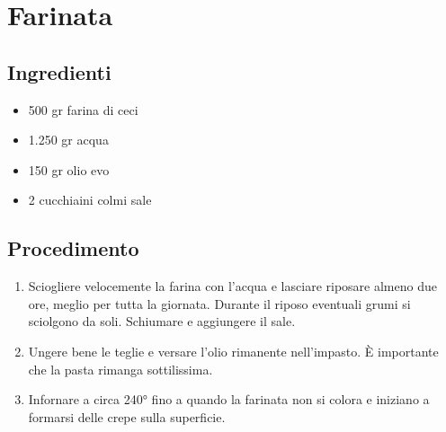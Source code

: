 \section{Farinata}
\subsection{Ingredienti}
\begin{itemize}
\item 500 gr farina di ceci  
\item 1.250 gr acqua  
\item 150 gr olio evo   
\item 2 cucchiaini colmi sale
\end{itemize}
\subsection{Procedimento}
\begin{enumerate}
\item  Sciogliere velocemente la farina con l'acqua e lasciare riposare almeno due ore, meglio per tutta la giornata. Durante il riposo eventuali grumi si sciolgono da soli. Schiumare e aggiungere il sale.  
\item  Ungere bene le teglie e versare l'olio rimanente nell'impasto. È importante che la pasta rimanga sottilissima.  
\item  Infornare a circa 240° fino a quando la farinata non si colora e iniziano a formarsi delle crepe sulla superficie. 
\end{enumerate}
